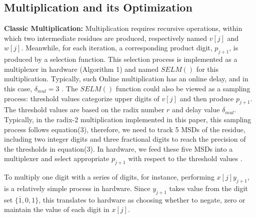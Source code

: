 \documentclass{sig-alternate}
\begin{document}
	\subsection{Multiplication and its Optimization}
	\noindent
	{\bf Classic Multiplication:} Multiplication requires recursive operations, within which two intermediate residues are produced, respectively named $v[j]$ and $w[j]$. 
	Meanwhile, for each iteration, a corresponding product digit, $p_{j+1}$, is produced by a selection function. This selection process is implemented as a multiplexer in hardware (Algorithm 1) and named $SELM()$ for this multiplication\cite{online_mul}. Typically, such Online multiplication has an online delay, and in this case, $\delta_{mul}=3$ \cite{online_mul}. 
	The $SELM()$ function could also be viewed as a sampling process: threshold values categorize upper digits of $v[j]$ and then produce $p_{j+1}$. The threshold values are based on the radix number $r$ and delay value $\delta_{mul}$\cite{online_mul}. Typically, in the radix-2 multiplication implemented in this paper, this sampling process follows equation(3), therefore, we need to track 5 MSDs of the residue, including two integer digits and three fractional digits to reach the precision of the thresholds in equation(3). In hardware, we feed these five MSDs into a multiplexer and select appropriate $p_{j+1}$ with respect to the threshold values \cite{online_mul}. 
	
	
	To multiply one digit with a series of digits, for instance, performing $x[j]y_{j+1}$, is a relatively simple process in hardware. Since $y_{j+1}$ takes value from the digit set $\{\bar{1},0,1\}$, this translates to hardware as choosing whether to negate, zero or maintain the value of each digit in $x[j]$.   
		  
\end{document}
